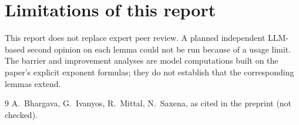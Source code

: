 \documentclass[11pt,a4paper]{article}
\begin{document}
\section*{Limitations of this report}
This report does not replace expert peer review. A planned independent LLM-based second opinion on each lemma
could not be run because of a usage limit. The barrier and improvement analyses are model computations built
on the paper's explicit exponent formulas; they do not establish that the corresponding lemmas extend.

\begin{thebibliography}{9}
 A.~Bhargava, G.~Ivanyos, R.~Mittal, N.~Saxena, as cited in the preprint (not checked).
\end{thebibliography}
\end{document}

